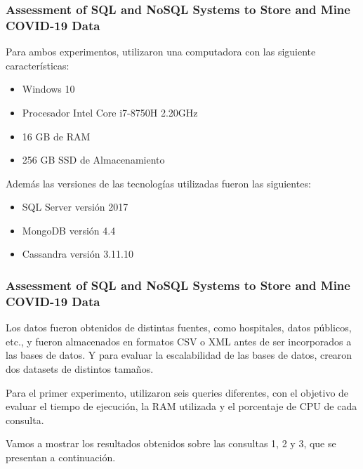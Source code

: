\begin{frame}
    \frametitle{Assessment of SQL and NoSQL Systems to Store and Mine COVID-19 Data}

    Para ambos experimentos, utilizaron una computadora con las siguiente características:

     
    
    \begin{itemize}
        \item Windows 10
        \item Procesador Intel Core i7-8750H 2.20GHz
        \item 16 GB de RAM
        \item 256 GB SSD de Almacenamiento
    \end{itemize}

     
    
    Además las versiones de las tecnologías utilizadas fueron las siguientes:

     
    
    \begin{itemize}
        \item SQL Server versión 2017
        \item MongoDB versión 4.4
        \item Cassandra versión 3.11.10
    \end{itemize}
\end{frame}

\begin{frame}
    \frametitle{Assessment of SQL and NoSQL Systems to Store and Mine COVID-19 Data}

    Los datos fueron obtenidos de distintas fuentes, como hospitales, datos públicos, etc., y fueron almacenados en formatos CSV o XML antes de ser incorporados a las bases de datos.   Y para evaluar la escalabilidad de las bases de datos, crearon dos datasets de distintos tamaños. 

     
    
    Para el primer experimento, utilizaron seis queries diferentes, con el objetivo de evaluar el tiempo de ejecución, la RAM utilizada y el porcentaje de CPU de cada consulta. 
    
     
    
    Vamos a mostrar los resultados obtenidos sobre las consultas 1, 2 y 3, que se presentan a continuación.

\end{frame}

